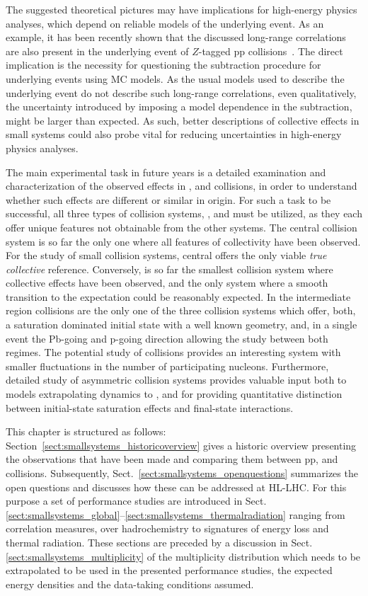 \documentclass[../report.tex]{subfiles}
\begin{document}
The suggested theoretical pictures may have implications for high-energy physics analyses, which depend on reliable models of the underlying event. As an example, it has been recently shown that the discussed long-range correlations are also present in the underlying event of $Z$-tagged pp collisions~\cite{ATLAS:2017nkt}. The direct implication is the necessity for questioning the subtraction procedure for underlying events using MC models. As the usual models used to describe the underlying event do not describe such long-range correlations, even qualitatively, the uncertainty introduced by imposing a model dependence in the subtraction, might be larger than expected. As such, better descriptions of collective effects in small systems could also probe vital for reducing uncertainties in high-energy physics analyses.

The main experimental task in future years is a detailed examination and characterization of the observed effects in \pp, \pPb and \PbPb collisions, in order to understand whether such effects are different or similar in origin. For such a task to be successful, all three types of collision systems, \pp, \pPb and \PbPb must be utilized, as they each offer unique features not obtainable from the other systems. The central \PbPb collision system is so far the only one where all features of collectivity have been observed. For the study of small collision systems, central \PbPb offers the only viable \emph{true collective} reference. Conversely, \pp is so far the smallest collision system where collective effects have been observed, and the only system where a smooth transition to the \Pepem expectation could be reasonably expected. In the intermediate region \pPb collisions are the only one of the three collision systems which offer, both, a saturation dominated initial state with a well known geometry, and, in a single event the Pb-going and p-going direction allowing the study between both regimes.
The potential study of \OO collisions provides an interesting system with smaller fluctuations in the number of participating nucleons.
Furthermore, detailed study of asymmetric collision systems provides valuable input both to models extrapolating \pp dynamics to \PbPb, and for providing quantitative distinction between initial-state saturation effects and final-state interactions.

This chapter is structured as follows: Section~\ref{sect:smallsystems_historicoverview} gives a historic overview presenting the observations that have been made and comparing them between pp, \pPb and \PbPb collisions. Subsequently, Sect.~\ref{sect:smallsystems_openquestions} summarizes the open questions and discusses how these can be addressed at HL-LHC. 
For this purpose a set of performance studies are introduced in Sect.\ref{sect:smallsystems_global}--\ref{sect:smallsystems_thermalradiation} ranging from correlation measures, over hadrochemistry to signatures of energy loss and thermal radiation. These sections are preceded by a discussion in Sect.\ref{sect:smallsystems_multiplicity} of the multiplicity distribution which needs to be extrapolated to be used in the presented performance studies, the expected energy densities and the data-taking conditions assumed.
\end{document}
